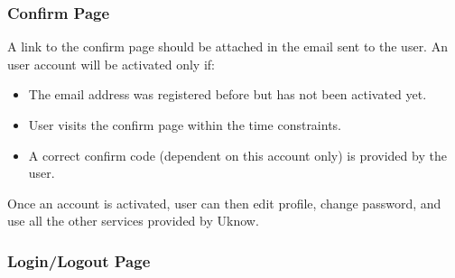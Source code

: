 \subsubsection{Confirm Page}

A link to the confirm page should be attached in the email sent to the
user. An user account will be activated only if:

\begin{itemize}
\itemsep1pt\parskip0pt
\item
  The email address was registered before but has not been activated
  yet.
\item
  User visits the confirm page within the time constraints.
\item
  A correct confirm code (dependent on this account only) is provided by
  the user.
\end{itemize}

Once an account is activated, user can then edit profile, change
password, and use all the other services provided by Uknow.

\subsubsection{Login/Logout Page}

